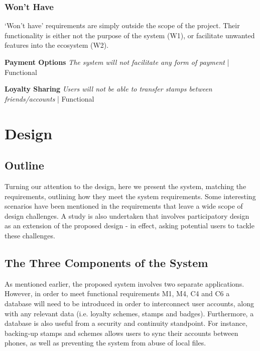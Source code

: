 \subsubsection{Won't Have}
`Won't have' requirements are simply outside the scope of the project. Their functionality is either not the purpose of the system (W1), or facilitate unwanted features into the ecosystem (W2).
\begin{description}[leftmargin=!,labelwidth=\widthof{\bfseries Medium}]
    \item[W1] \textbf{Payment Options} \newline
        \textit{The system will not facilitate any form of payment}  | Functional  
        
    \item[W2] \textbf{Loyalty Sharing} \newline
        \textit{Users will not be able to transfer stamps between friends/accounts}  | Functional 
\end{description}

\clearpage{}
\section{Design}
\subsection{Outline}
Turning our attention to the design, here we present the system, matching the requirements, outlining how they meet the system requirements. Some interesting scenarios have been mentioned in the requirements that leave a wide scope of design challenges. A study is also undertaken that involves participatory design as an extension of the proposed design - in effect, asking potential users to tackle these challenges.


\subsection{The Three Components of the System}
\label{sec:databasepls}
As mentioned earlier, the proposed system involves two separate applications. However, in order to meet functional requirements M1, M4, C4 and C6 a database will need to be introduced in order to interconnect user accounts, along with any relevant data (i.e. loyalty schemes, stamps and badges). Furthermore, a database is also useful from a security and continuity standpoint. For instance, backing-up stamps and schemes allows users to sync their accounts between phones, as well as preventing the system from abuse of local files.

